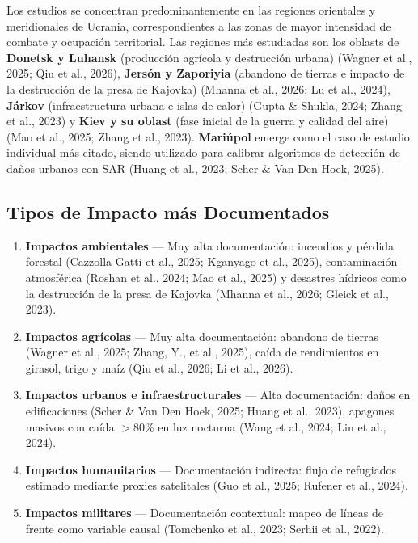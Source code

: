 \documentclass[12pt, a4paper]{article}
\begin{document}
Los estudios se concentran predominantemente en las regiones orientales y meridionales de Ucrania, correspondientes a las zonas de mayor intensidad de combate y ocupación territorial. Las regiones más estudiadas son los oblasts de \textbf{Donetsk y Luhansk} (producción agrícola y destrucción urbana) (Wagner et al., 2025; Qiu et al., 2026), \textbf{Jersón y Zaporiyia} (abandono de tierras e impacto de la destrucción de la presa de Kajovka) (Mhanna et al., 2026; Lu et al., 2024), \textbf{Járkov} (infraestructura urbana e islas de calor) (Gupta \& Shukla, 2024; Zhang et al., 2023) y \textbf{Kiev y su oblast} (fase inicial de la guerra y calidad del aire) (Mao et al., 2025; Zhang et al., 2023). \textbf{Mariúpol} emerge como el caso de estudio individual más citado, siendo utilizado para calibrar algoritmos de detección de daños urbanos con SAR (Huang et al., 2023; Scher \& Van Den Hoek, 2025).

\subsection{Tipos de Impacto más Documentados}

\begin{tcolorbox}[
    colback=lightbg,
    colframe=primary,
    arc=4pt,
    boxrule=0.6pt,
    title={\bfseries\color{white} Jerarquía de documentación científica},
    coltitle=white,
    fonttitle=\small\bfseries,
    attach boxed title to top left={yshift=-2mm, xshift=4mm},
    boxed title style={colback=primary, arc=2pt}
]
\begin{enumerate}
    \item \textbf{\color{primary}Impactos ambientales} — Muy alta documentación: incendios y pérdida forestal (Cazzolla Gatti et al., 2025; Kganyago et al., 2025), contaminación atmosférica (Roshan et al., 2024; Mao et al., 2025) y desastres hídricos como la destrucción de la presa de Kajovka (Mhanna et al., 2026; Gleick et al., 2023).
    \item \textbf{\color{primary}Impactos agrícolas} — Muy alta documentación: abandono de tierras (Wagner et al., 2025; Zhang, Y., et al., 2025), caída de rendimientos en girasol, trigo y maíz (Qiu et al., 2026; Li et al., 2026).
    \item \textbf{\color{primary}Impactos urbanos e infraestructurales} — Alta documentación: daños en edificaciones (Scher \& Van Den Hoek, 2025; Huang et al., 2023), apagones masivos con caída $>$80\% en luz nocturna (Wang et al., 2024; Lin et al., 2024).
    \item \textbf{\color{primary}Impactos humanitarios} — Documentación indirecta: flujo de refugiados estimado mediante proxies satelitales (Guo et al., 2025; Rufener et al., 2024).
    \item \textbf{\color{primary}Impactos militares} — Documentación contextual: mapeo de líneas de frente como variable causal (Tomchenko et al., 2023; Serhii et al., 2022).
\end{enumerate}
\end{tcolorbox}
\end{document}
